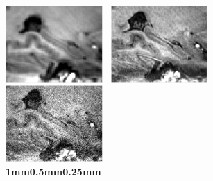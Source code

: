 \documentclass[]{article}
\begin{document}
\begin{figure}
	
	{\includegraphics[width=0.33\textwidth]{denoised5025_200_y.pdf}}~
	{\includegraphics[width=0.33\textwidth]{denoised5025_400_y.pdf}}~
	{\includegraphics[width=0.33\textwidth]{denoised5025_700_y.pdf}}~\\
		\vspace{-1em}
	\hspace{5em}\textbf{1mm}\hspace{9em}\textbf{0.5mm}\hspace{8em}\textbf{0.25mm}
\end{figure}
\end{document}
